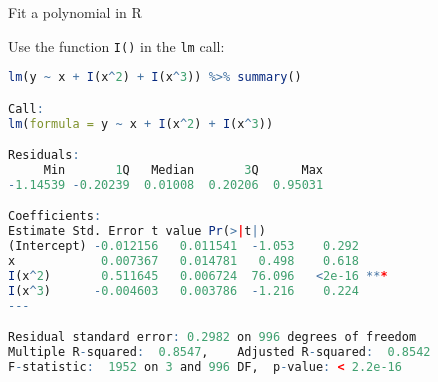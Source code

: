 \documentclass{beamer}
\begin{document}




\begin{frame}[fragile]{Fit a polynomial in R} 
	
	Use the function \texttt{I()} in the \texttt{lm} call: \\
	\begin{lstlisting}[language=R, basicstyle=\tiny]
lm(y ~ x + I(x^2) + I(x^3)) %>% summary()

Call:
lm(formula = y ~ x + I(x^2) + I(x^3))

Residuals:
     Min       1Q   Median       3Q      Max 
-1.14539 -0.20239  0.01008  0.20206  0.95031 

Coefficients:
Estimate Std. Error t value Pr(>|t|)    
(Intercept) -0.012156   0.011541  -1.053    0.292    
x            0.007367   0.014781   0.498    0.618    
I(x^2)       0.511645   0.006724  76.096   <2e-16 ***
I(x^3)      -0.004603   0.003786  -1.216    0.224    
---

Residual standard error: 0.2982 on 996 degrees of freedom
Multiple R-squared:  0.8547,	Adjusted R-squared:  0.8542 
F-statistic:  1952 on 3 and 996 DF,  p-value: < 2.2e-16
	\end{lstlisting}

\end{frame}
\end{document}
